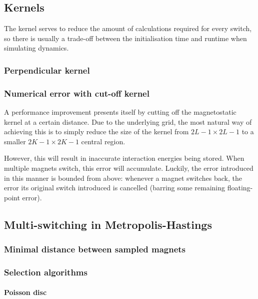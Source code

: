 \subsection{Kernels}\label{sec:2:Kernels}
The kernel serves to reduce the amount of calculations required for every switch, so there is usually a trade-off between the initialisation time and runtime when simulating dynamics.
\subsubsection{Perpendicular kernel} %
\subsubsection{Numerical error with cut-off kernel} %
A performance improvement presents itself by cutting off the magnetostatic kernel at a certain distance.
Due to the underlying grid, the most natural way of achieving this is to simply reduce the size of the kernel from $2L-1 \times 2L-1$ to a smaller $2K-1 \times 2K-1$ central region. \par %
However, this will result in inaccurate interaction energies being stored.
When multiple magnets switch, this error will accumulate.
Luckily, the error introduced in this manner is bounded from above: whenever a magnet switches back, the error its original switch introduced is cancelled (barring some remaining floating-point error).

\subsection{Multi-switching in Metropolis-Hastings} \label{sec:2:MultiSwitch} %
\subsubsection{Minimal distance between sampled magnets} %
\subsubsection{Selection algorithms}
\paragraph{Poisson disc}
